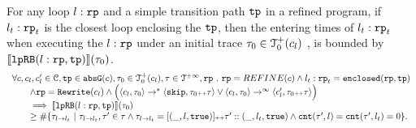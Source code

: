 
\begin{lemma}
    For any loop $l: \mathtt{rp}$ and a simple transition path $\mathtt{tp}$ in a refined program, if $l_t: \mathtt{rp}_t$ is the closest loop enclosing the $\mathtt{tp}$, then the entering times of $l_t: \mathtt{rp}_t$ when executing the $l: \mathtt{rp}$ under an initial trace $\mathtt{\tau}_0 \in \mathcal{T}^{+}_0(c_l)$ , is bounded by $\llbracket \mathtt{lpRB}(l: \mathtt{rp}, \mathtt{tp}) \rrbracket(\mathtt{\tau}_0)$.
    \[
      \begin{array}{l}
      \forall c, c_l, c_l' \in \cdom, \tpath \in \absG(c), \trace_0 \in \ftdom_0(c_l), \trace \in \tdom, \rprog \st 
      \rprog = REFINE(c)
      \land
      l_t: \rprog_t = \kw{enclosed}(\rprog, \tpath)
      \\ \qquad
      \land 
      \rprog = \algrewrite(c_l)
      \land
      \Big(
      \config{c_l, \trace_0} \to^* \config{\eskip, \trace_0 \tracecat \trace}
      \lor \config{c_l, \trace_0} \to^\infty \config{c_l', \trace_0 \tracecat \trace} 
      \Big)
      \\ \qquad
      \implies
      \econfig{\lpchB(l: \rprog, \tpath)}(\trace_0) 
      \\ \qquad \geq 
      \# \left\{\trace_{l \to l_t} ~\vert~ \trace_{l \to l_t}, \trace' \in \trace \land \trace_{l \to l_t} = [(\_, l, \etrue)] \tracecat \trace' :: (\_, l_t, \etrue)
      \land \counter(\trace', l) = \counter(\trace', l_t) = 0 
      \right\}.
      \end{array}
    \]  
  \end{lemma}
